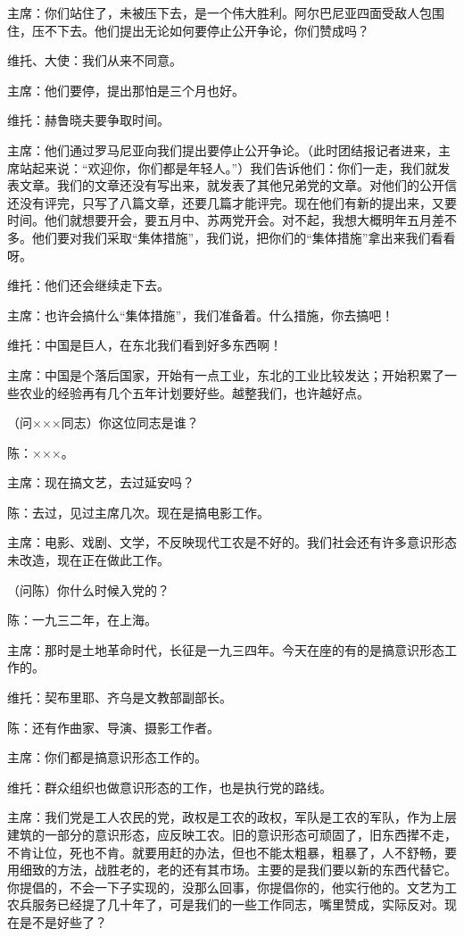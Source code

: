 主席：你们站住了，未被压下去，是一个伟大胜利。阿尔巴尼亚四面受敌人包围住，压不下去。他们提出无论如何要停止公开争论，你们赞成吗？

维托、大使：我们从来不同意。

主席：他们要停，提出那怕是三个月也好。

维托：赫鲁晓夫要争取时间。

主席：他们通过罗马尼亚向我们提出要停止公开争论。（此时团结报记者进来，主席站起来说：“欢迎你，你们都是年轻人。”）我们告诉他们：你们一走，我们就发表文章。我们的文章还没有写出来，就发表了其他兄弟党的文章。对他们的公开信还没有评完，只写了八篇文章，还要几篇才能评完。现在他们有新的提出来，又要时间。他们就想要开会，要五月中、苏两党开会。对不起，我想大概明年五月差不多。他们要对我们采取“集体措施”，我们说，把你们的“集体措施”拿出来我们看看呀。

维托：他们还会继续走下去。

主席：也许会搞什么“集体措施”，我们准备着。什么措施，你去搞吧！

维托：中国是巨人，在东北我们看到好多东西啊！

主席：中国是个落后国家，开始有一点工业，东北的工业比较发达；开始积累了一些农业的经验再有几个五年计划要好些。越整我们，也许越好点。

（问×××同志）你这位同志是谁？

陈：×××。

主席：现在搞文艺，去过延安吗？

陈：去过，见过主席几次。现在是搞电影工作。

主席：电影、戏剧、文学，不反映现代工农是不好的。我们社会还有许多意识形态未改造，现在正在做此工作。

（问陈）你什么时候入党的？

陈：一九三二年，在上海。

主席：那时是土地革命时代，长征是一九三四年。今天在座的有的是搞意识形态工作的。

维托：契布里耶、齐乌是文教部副部长。

陈：还有作曲家、导演、摄影工作者。

主席：你们都是搞意识形态工作的。

维托：群众组织也做意识形态的工作，也是执行党的路线。

主席：我们党是工人农民的党，政权是工农的政权，军队是工农的军队，作为上层建筑的一部分的意识形态，应反映工农。旧的意识形态可顽固了，旧东西撵不走，不肯让位，死也不肯。就要用赶的办法，但也不能太粗暴，粗暴了，人不舒畅，要用细致的方法，战胜老的，老的还有其市场。主要的是我们要以新的东西代替它。你提倡的，不会一下子实现的，没那么回事，你提倡你的，他实行他的。文艺为工农兵服务已经提了几十年了，可是我们的一些工作同志，嘴里赞成，实际反对。现在是不是好些了？


